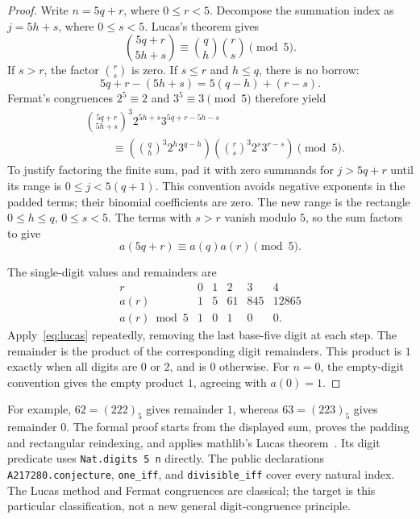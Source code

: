 \documentclass[11pt]{article}
\begin{document}
\begin{proof}
Write $n=5q+r$, where $0\le r<5$. Decompose the summation index as
$j=5h+s$, where $0\le s<5$. Lucas's theorem gives
\[
 \binom{5q+r}{5h+s}\equiv\binom qh\binom rs\pmod5.
\]
If $s>r$, the factor $\binom rs$ is zero. If $s\le r$ and $h\le q$,
there is no borrow:
\[
 5q+r-(5h+s)=5(q-h)+(r-s).
\]
Fermat's congruences $2^5\equiv2$ and $3^5\equiv3\pmod5$ therefore yield
\begin{align*}
 &\binom{5q+r}{5h+s}^{\!3}2^{5h+s}3^{5q+r-5h-s}\\
 &\hspace{1cm}\equiv
 \left(\binom qh^3 2^h3^{q-h}\right)
 \left(\binom rs^3 2^s3^{r-s}\right)\pmod5.
\end{align*}
To justify factoring the finite sum, pad it with zero summands for
$j>5q+r$ until its range is $0\le j<5(q+1)$. This convention avoids
negative exponents in the padded terms; their binomial coefficients
are zero. The new range is the rectangle
$0\le h\le q$, $0\le s<5$. The terms with $s>r$ vanish modulo $5$,
so the sum factors to give
\begin{equation}\label{eq:lucas}
 a(5q+r)\equiv a(q)a(r)\pmod5.
\end{equation}

The single-digit values and remainders are
\[
\begin{array}{c|rrrrr}
 r&0&1&2&3&4\\\hline
 a(r)&1&5&61&845&12865\\
 a(r)\bmod5&1&0&1&0&0.
\end{array}
\]
Apply~\eqref{eq:lucas} repeatedly, removing the last base-five digit at
each step. The remainder is the product of the corresponding digit
remainders. This product is $1$ exactly when all digits are $0$ or $2$,
and is $0$ otherwise. For $n=0$, the empty-digit convention gives the
empty product $1$, agreeing with $a(0)=1$.
\end{proof}

For example, $62=(222)_5$ gives remainder $1$, whereas $63=(223)_5$
gives remainder $0$. The formal proof starts from the displayed sum,
proves the padding and rectangular reindexing, and applies mathlib's
Lucas theorem~\cite{Lucas}. Its digit predicate uses
\texttt{Nat.digits 5 n} directly. The public declarations
\texttt{A217280.conjecture}, \texttt{one\_iff}, and
\texttt{divisible\_iff} cover every natural index. The Lucas method and
Fermat congruences are classical; the target is this particular
classification, not a new general digit-congruence principle.
\end{document}
